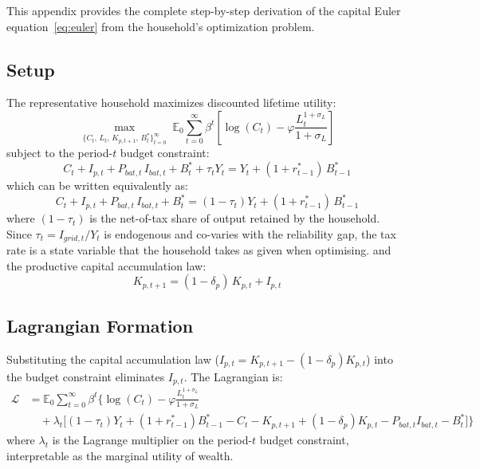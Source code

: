 \documentclass[12pt, a4paper]{article}
\begin{document}
This appendix provides the complete step-by-step derivation of the capital Euler equation~\eqref{eq:euler} from the household's optimization problem.

\subsection*{Setup}

The representative household maximizes discounted lifetime utility:
\begin{equation*}
\max_{\{C_t,\, L_t,\, K_{p,t+1},\, B^*_t\}_{t=0}^{\infty}} \;
\mathbb{E}_0 \sum_{t=0}^{\infty} \beta^t
\left[\log(C_t) - \varphi \frac{L_t^{1+\sigma_L}}{1+\sigma_L}\right]
\end{equation*}
subject to the period-$t$ budget constraint:
\begin{equation*}
C_t + I_{p,t} + P_{bat,t}\,I_{bat,t} + B^*_t + \tau_t Y_t
= Y_t + (1+r^*_{t-1})\,B^*_{t-1}
\end{equation*}
which can be written equivalently as:
\begin{equation*}
C_t + I_{p,t} + P_{bat,t}\,I_{bat,t} + B^*_t
= (1-\tau_t) Y_t + (1+r^*_{t-1})\,B^*_{t-1}
\end{equation*}
where $(1-\tau_t)$ is the net-of-tax share of output retained by the household. Since $\tau_t = I_{grid,t}/Y_t$ is endogenous and co-varies with the reliability gap, the tax rate is a state variable that the household takes as given when optimising.
and the productive capital accumulation law:
\begin{equation*}
K_{p,t+1} = (1-\delta_p)\,K_{p,t} + I_{p,t}
\end{equation*}

\subsection*{Lagrangian Formation}

Substituting the capital accumulation law ($I_{p,t} = K_{p,t+1} - (1-\delta_p)K_{p,t}$) into the budget constraint eliminates $I_{p,t}$. The Lagrangian is:
\begin{align*}
\mathcal{L} &= \mathbb{E}_0 \sum_{t=0}^{\infty} \beta^t \Bigg\{
\log(C_t) - \varphi \frac{L_t^{1+\sigma_L}}{1+\sigma_L} \\
&\quad + \lambda_t \Big[(1-\tau_t)Y_t + (1+r^*_{t-1})B^*_{t-1} - C_t
- K_{p,t+1} + (1-\delta_p)K_{p,t}
- P_{bat,t}I_{bat,t} - B^*_t\Big]
\Bigg\}
\end{align*}
where $\lambda_t$ is the Lagrange multiplier on the period-$t$ budget constraint, interpretable as the marginal utility of wealth.
\end{document}
